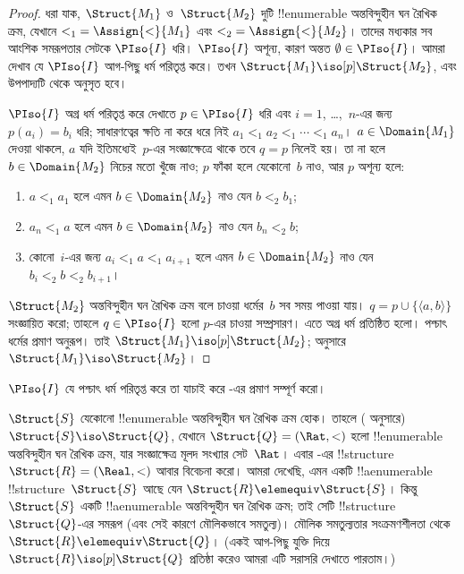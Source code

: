 \documentclass[../../../include/open-logic-section]{subfiles}
\begin{document}
\begin{proof}
  ধরা যাক, $\Struct{M_1}$ ও~$\Struct{M_2}$ দুটি !!{enumerable}
  অন্তবিন্দুহীন ঘন রৈখিক ক্রম, যেখানে ${<_1} = \Assign{<}{M_1}$ এবং
  ${<_2} = \Assign{<}{M_2}$। তাদের মধ্যকার সব আংশিক সমরূপতার সেটকে
  $\PIso{I}$ ধরি। $\PIso{I}$ অশূন্য, কারণ অন্তত $\emptyset \in
  \PIso{I}$। আমরা দেখাব যে $\PIso{I}$ আগ-পিছু ধর্ম পরিতৃপ্ত করে। তখন
  $\Struct{M_1} \iso[p] \Struct{M_2}$, এবং উপপাদ্যটি
   থেকে অনুসৃত হবে।

  $\PIso{I}$ অগ্র ধর্ম পরিতৃপ্ত করে দেখাতে $p \in \PIso{I}$ ধরি এবং
  $i = 1$, \dots,~$n$-এর জন্য $p(a_i) = b_i$ ধরি; সাধারণত্বের ক্ষতি না
  করে ধরে নিই $a_1 <_1 a_2 <_1 \cdots <_1 a_n$। $a \in
  \Domain{M_1}$ দেওয়া থাকলে, $a$ যদি ইতিমধ্যেই~$p$-এর সংজ্ঞাক্ষেত্রে
  থাকে তবে $q=p$ নিলেই হয়। তা না হলে $b \in \Domain{M_2}$ নিচের মতো
  খুঁজে নাও; $p$ ফাঁকা হলে যেকোনো~$b$ নাও, আর $p$ অশূন্য হলে:
  \begin{enumerate}
  \item $a <_1 a_1$ হলে এমন $b \in \Domain{M_2}$ নাও যেন $b <_2 b_1$;
  \item $a_n <_1 a$ হলে এমন $b \in \Domain{M_2}$ নাও যেন $b_n <_2 b$;
 \item কোনো~$i$-এর জন্য $a_i <_1 a <_1 a_{i+1}$ হলে এমন $b \in
   \Domain{M_2}$ নাও যেন $b_i <_2 b <_2 b_{i+1}$।
  \end{enumerate}
  $\Struct{M_2}$ অন্তবিন্দুহীন ঘন রৈখিক ক্রম বলে চাওয়া ধর্মের~$b$ সব
  সময় পাওয়া যায়। $q = p \cup \{ \langle a, b \rangle \}$
  সংজ্ঞায়িত করো; তাহলে $q \in \PIso{I}$ হলো $p$-এর চাওয়া সম্প্রসারণ।
  এতে অগ্র ধর্ম প্রতিষ্ঠিত হলো। পশ্চাৎ ধর্মের প্রমাণ অনুরূপ। তাই
  $\Struct{M_1} \iso[p] \Struct{M_2}$; 
  অনুসারে $\Struct{M_1} \iso \Struct{M_2}$।
\end{proof}

\begin{prob}
  $\PIso{I}$ যে পশ্চাৎ ধর্ম পরিতৃপ্ত করে তা যাচাই করে
  -এর প্রমাণ সম্পূর্ণ করো।
\end{prob}

\begin{rem}
  $\Struct{S}$ যেকোনো !!{enumerable} অন্তবিন্দুহীন ঘন রৈখিক ক্রম হোক।
  তাহলে ( অনুসারে) $\Struct{S} \iso \Struct{Q}$,
  যেখানে $\Struct{Q} = (\Rat, <)$ হলো !!{enumerable} অন্তবিন্দুহীন ঘন
  রৈখিক ক্রম, যার সংজ্ঞাক্ষেত্র মূলদ সংখ্যার সেট~$\Rat$। এবার
  -এর !!{structure}~$\Struct{R} = (\Real, <)$ আবার
  বিবেচনা করো। আমরা দেখেছি, এমন একটি !!a{enumerable} !!{structure}~$\Struct{S}$
  আছে যেন $\Struct{R} \elemequiv \Struct{S}$। কিন্তু $\Struct{S}$
  একটি !!a{enumerable} অন্তবিন্দুহীন ঘন রৈখিক ক্রম; তাই সেটি
  !!{structure}~$\Struct{Q}$-এর সমরূপ (এবং সেই কারণে মৌলিকভাবে
  সমতুল্য)। মৌলিক সমতুল্যতার সংক্রমণশীলতা থেকে $\Struct{R} \elemequiv
  \Struct{Q}$। (একই আগ-পিছু যুক্তি দিয়ে $\Struct{R} \iso[p]
  \Struct{Q}$ প্রতিষ্ঠা করেও আমরা এটি সরাসরি দেখাতে পারতাম।)
\end{rem}
\end{document}
